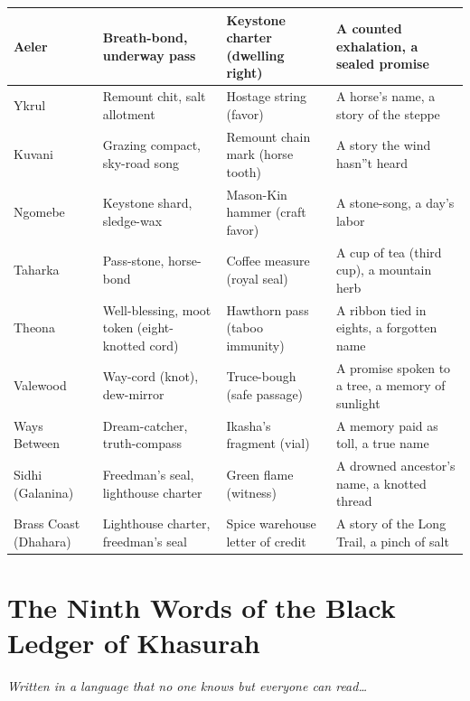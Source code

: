 \documentclass[11pt,letterpaper,twoside]{book}
\begin{document}
\begin{longtable}{|p{}|p{}|p{}|p{}|}
\hline
Aeler & Breath-bond, underway pass & Keystone charter (dwelling right) & A counted exhalation, a sealed promise \\
\hline
Ykrul & Remount chit, salt allotment & Hostage string (favor) & A horse's name, a story of the steppe \\
\hline
Kuvani & Grazing compact, sky-road song & Remount chain mark (horse tooth) & A story the wind hasn''t heard \\
\hline
Ngomebe & Keystone shard, sledge-wax & Mason-Kin hammer (craft favor) & A stone-song, a day's labor \\
\hline
Taharka & Pass-stone, horse-bond & Coffee measure (royal seal) & A cup of tea (third cup), a mountain herb \\
\hline
Theona & Well-blessing, moot token (eight-knotted cord) & Hawthorn pass (taboo immunity) & A ribbon tied in eights, a forgotten name \\
\hline
Valewood & Way-cord (knot), dew-mirror & Truce-bough (safe passage) & A promise spoken to a tree, a memory of sunlight \\
\hline
Ways Between & Dream-catcher, truth-compass & Ikasha's fragment (vial) & A memory paid as toll, a true name \\
\hline
Sidhi (Galanina) & Freedman's seal, lighthouse charter & Green flame (witness) & A drowned ancestor's name, a knotted thread \\
\hline
Brass Coast (Dhahara) & Lighthouse charter, freedman's seal & Spice warehouse letter of credit & A story of the Long Trail, a pinch of salt \\
\hline
\end{longtable}
\endgroup

\cleardoublepage

\chapter{The Ninth Words of the Black Ledger of Khasurah}

\begin{center}
  \textit{Written in a language that no one knows but everyone can read\dots}
\end{center}
\end{document}
